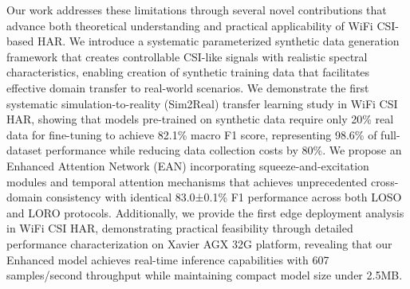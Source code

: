 \documentclass[journal]{IEEEtran}
\begin{document}
Our work addresses these limitations through several novel contributions that advance both theoretical understanding and practical applicability of WiFi CSI-based HAR. We introduce a systematic parameterized synthetic data generation framework that creates controllable CSI-like signals with realistic spectral characteristics, enabling creation of synthetic training data that facilitates effective domain transfer to real-world scenarios. We demonstrate the first systematic simulation-to-reality (Sim2Real) transfer learning study in WiFi CSI HAR, showing that models pre-trained on synthetic data require only 20\% real data for fine-tuning to achieve 82.1\% macro F1 score, representing 98.6\% of full-dataset performance while reducing data collection costs by 80\%. We propose an Enhanced Attention Network (EAN) incorporating squeeze-and-excitation modules and temporal attention mechanisms that achieves unprecedented cross-domain consistency with identical 83.0±0.1\% F1 performance across both LOSO and LORO protocols. Additionally, we provide the first edge deployment analysis in WiFi CSI HAR, demonstrating practical feasibility through detailed performance characterization on Xavier AGX 32G platform, revealing that our Enhanced model achieves real-time inference capabilities with 607 samples/second throughput while maintaining compact model size under 2.5MB.
\end{document}
